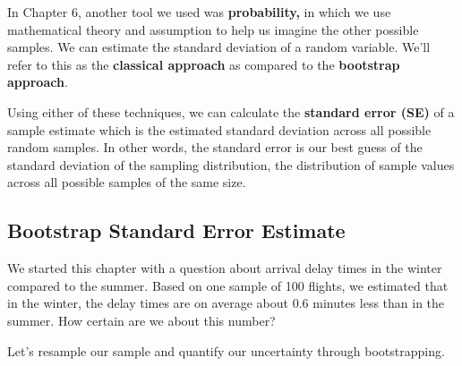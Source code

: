\documentclass[
]{book}
\newenvironment{Shaded}{\begin{snugshade}}{\end{snugshade}}
\newcommand{\CommentTok}[1]{\textcolor[rgb]{0.56,0.35,0.01}{\textit{#1}}}
\newcommand{\DataTypeTok}[1]{\textcolor[rgb]{0.13,0.29,0.53}{#1}}
\newcommand{\DecValTok}[1]{\textcolor[rgb]{0.00,0.00,0.81}{#1}}
\newcommand{\KeywordTok}[1]{\textcolor[rgb]{0.13,0.29,0.53}{\textbf{#1}}}
\newcommand{\NormalTok}[1]{#1}
\newcommand{\OperatorTok}[1]{\textcolor[rgb]{0.81,0.36,0.00}{\textbf{#1}}}
\newcommand{\OtherTok}[1]{\textcolor[rgb]{0.56,0.35,0.01}{#1}}
\newcommand{\StringTok}[1]{\textcolor[rgb]{0.31,0.60,0.02}{#1}}
\begin{document}
In Chapter 6, another tool we used was \textbf{probability,} in which we use mathematical theory and assumption to help us imagine the other possible samples. We can estimate the standard deviation of a random variable. We'll refer to this as the \textbf{classical approach} as compared to the \textbf{bootstrap approach}.

Using either of these techniques, we can calculate the \textbf{standard error (SE)} of a sample estimate which is the estimated standard deviation across all possible random samples. In other words, the standard error is our best guess of the standard deviation of the sampling distribution, the distribution of sample values across all possible samples of the same size.

\hypertarget{bootstrap-standard-error-estimate}{%
\subsection{Bootstrap Standard Error Estimate}\label{bootstrap-standard-error-estimate}}

We started this chapter with a question about arrival delay times in the winter compared to the summer. Based on one sample of 100 flights, we estimated that in the winter, the delay times are on average about 0.6 minutes less than in the summer. How certain are we about this number?

Let's resample our sample and quantify our uncertainty through bootstrapping.

\begin{Shaded}
\end{Shaded}
\end{document}
